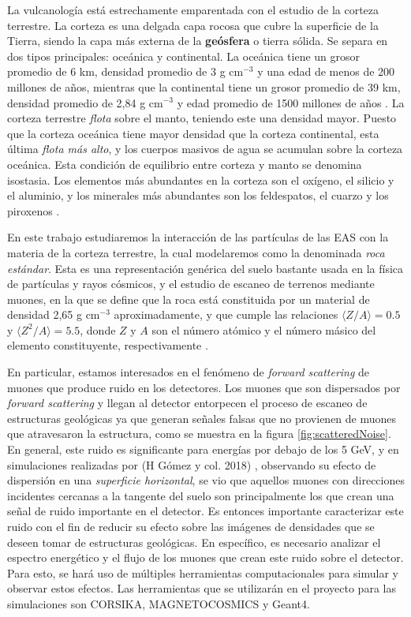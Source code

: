 \documentclass[12pt]{report}
\begin{document}
La vulcanología está estrechamente emparentada con el estudio de la corteza terrestre. La corteza es una delgada capa rocosa que cubre la superficie de la Tierra, siendo la capa más externa de la \textbf{geósfera} o tierra sólida. Se separa en dos tipos principales: oceánica y continental. La oceánica tiene un grosor promedio de 6 km, densidad promedio de 3 g cm$^{-3}$ y una edad de menos de 200 millones de años, mientras que la continental tiene un grosor promedio de 39 km, densidad promedio de 2,84 g cm$^{-3}$ y edad promedio de 1500 millones de años \cite{mooney20101}. La corteza terrestre \textit{flota} sobre el manto, teniendo este una densidad mayor. Puesto que la corteza oceánica tiene mayor densidad que la corteza continental, esta última \textit{flota más alto}, y los cuerpos masivos de agua se acumulan sobre la corteza oceánica. Esta condición de equilibrio entre corteza y manto se denomina isostasia. Los elementos más abundantes en la corteza son el oxígeno, el silicio y el aluminio, y los minerales más abundantes son los feldespatos, el cuarzo y los piroxenos \cite{anderson2010geomorphology}.

En este trabajo estudiaremos la interacción de las partículas de las EAS con la materia de la corteza terrestre, la cual modelaremos como la denominada \textit{roca estándar}. Esta es una representación genérica del suelo bastante usada en la física de partículas y rayos cósmicos, y el estudio de escaneo de terrenos mediante muones, en la que se define que la roca está constituida por un material de densidad 2,65 g cm$^{-3}$ aproximadamente, y que cumple las relaciones $\langle Z/A \rangle=0.5$ y $\langle Z^2/A \rangle=5.5$, donde $Z$ y $A$ son el número atómico y el número másico del elemento constituyente, respectivamente \cite{groom2001muon}.

En particular, estamos interesados en el fenómeno de \textit{forward scattering} de muones que produce ruido en los detectores. Los muones que son dispersados por \textit{forward scattering} y llegan al detector entorpecen el proceso de escaneo de estructuras geológicas ya que generan señales falsas que no provienen de muones que atravesaron la estructura, como se muestra en la figura \ref{fig:scatteredNoise}. En general, este ruido es significante para energías por debajo de los 5 GeV, y en simulaciones realizadas por (H Gómez y col. 2018) \cite{gomez2017forward}, observando su efecto de dispersión en una \textit{superficie horizontal}, se vio que aquellos muones con direcciones incidentes cercanas a la tangente del suelo son principalmente los que crean una señal de ruido importante en el detector. Es entonces importante caracterizar este ruido con el fin de reducir su efecto sobre las imágenes de densidades que se deseen tomar de estructuras geológicas. En específico, es necesario analizar el espectro energético y el flujo de los muones que crean este ruido sobre el detector. Para esto, se hará uso de múltiples herramientas computacionales para simular y observar estos efectos. Las herramientas que se utilizarán en el proyecto para las simulaciones son CORSIKA, MAGNETOCOSMICS y Geant4.
\end{document}
